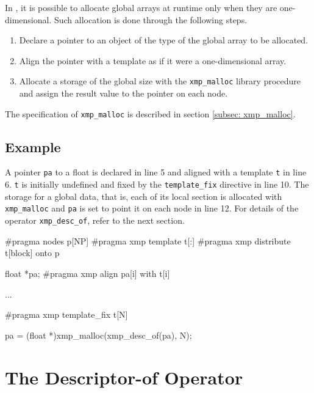 In {\XMPC}, it is possible to allocate global arrays at runtime only
when they are one-dimensional.
%
Such allocation is done through the following steps.
%
\begin{enumerate}
 \item Declare a pointer to an object of the type of the global array to
       be allocated.
 \item Align the pointer with a template as if it were a one-dimensional
       array.
 \item Allocate a storage of the global size with the {\tt xmp\_malloc}
       library procedure and assign the result value to the
       pointer on each node.
\end{enumerate}
%
The specification of {\tt xmp\_malloc} is described in section
\ref{subsec: xmp_malloc}.

\subsection*{Example}

A pointer {\tt pa} to a float is declared in line 5 and aligned with a
template {\tt t} in line 6. {\tt t} is initially undefined and fixed by
the {\tt template\_fix} directive in line 10. The storage for a global
data, that is, each of its local section is allocated with {\tt
xmp\_malloc} and {\tt pa} is set to point it on each node in line 12. For
details of the operator {\tt xmp\_desc\_of}, refer to the next section.

\begin{XCexample}
#pragma nodes p[NP]
#pragma xmp template t[:]
#pragma xmp distribute t[block] onto p

float *pa;
#pragma xmp align pa[i] with t[i]

...

#pragma xmp template_fix t[N]

pa = (float *)xmp_malloc(xmp_desc_of(pa), N);
\end{XCexample}

\section{The Descriptor-of Operator}
\label{sec:Descriptor of Global Data in C}


